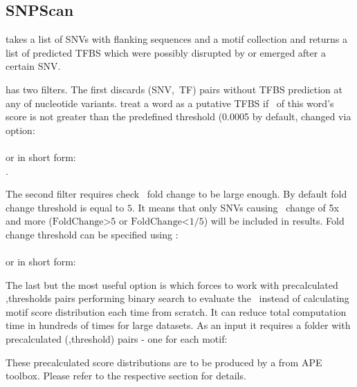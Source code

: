 \subsection{SNPScan}
 takes a list of SNVs with flanking sequences and a motif collection and returns a list of predicted TFBS which were possibly disrupted by or emerged after a certain SNV.
\usageheader
{}


 has two filters. The first discards (SNV,~TF) pairs without TFBS prediction at any of nucleotide variants.  treat a word as a putative TFBS if \pvalue\ of this word's score is not greater than the predefined threshold (0.0005 by default, changed via  option:\\
\\
or in short form:\\
.

The second filter requires check \pvalue\ fold change to be large enough. By default fold change threshold is equal to $5$. It means that only SNVs causing \pvalue\ change of 5x and more ($\mbox{FoldChange>5}$ or $\mbox{FoldChange<1/5}$) will be included in results. Fold change threshold can be specified using :\\
\\
or in short form:\\

The last but the most useful option is  which forces  to work with precalculated \pvalue,thresholds pairs performing binary search to evaluate the \pvalue\ instead of calculating motif score distribution each time from scratch. It can reduce total computation time in hundreds of times for large datasets.
As an input it requires a folder with precalculated (\pvalue,threshold) pairs - one for each motif:\\

These precalculated score distributions are to be produced by a  from APE toolbox.
Please refer to the respective section for details.


